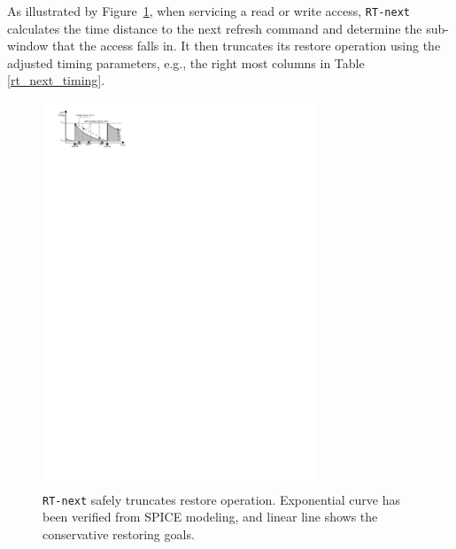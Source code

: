 As illustrated by Figure~\ref{fig:rtnext}, when servicing a read or write access, {\tt RT-next}  
calculates the time distance to the next refresh command and determine the sub-window that the access falls in. It then truncates its restore operation using the adjusted timing parameters, e.g., the right most columns in Table \ref{rt_next_timing}.

\begin{figure}[htbp]
\begin{center}
\centering
\includegraphics[width=3.2in]{figures/HPCA16/rt_next.pdf}
\vspace{-0.2in}
\caption{{\tt RT-next} safely truncates restore operation. Exponential curve has been verified from SPICE modeling, and linear line shows the conservative restoring goals.}
\label{fig:rtnext}
\vspace{-0.45in}
\end{center}
\end{figure}





